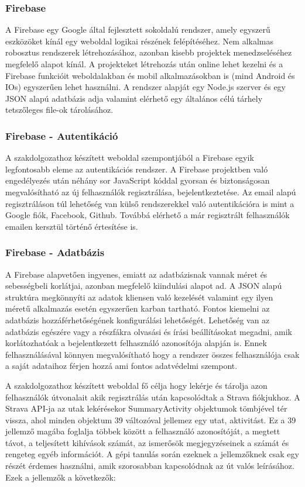 \subsubsection{Firebase}
A Firebase egy Google által fejlesztett sokoldalú rendszer, amely egyszerű eszközöket kínál egy weboldal logikai részének felépítéséhez. Nem alkalmas robosztus rendszerek létrehozásához, azonban kisebb projektek menedzseléséhez megfelelő alapot kínál. A projekteket létrehozás után online lehet kezelni és a Firebase funkcióit weboldalakban és mobil alkalmazásokban is (mind Android és IOs) egyszerűen lehet használni. A rendszer alapját egy Node.js szerver és egy JSON alapú adatbázis adja valamint elérhető egy általános célú tárhely tetszőleges file-ok tárolásához. 

\subsubsection{Firebase - Autentikáció}
A szakdolgozathoz készített weboldal szempontjából a Firebase egyik legfontosabb eleme az autentikációs rendszer. A Firebase projektben való engedélyezés után néhány sor JavaScript kóddal gyorsan és biztonságosan megvalósítható az új felhasználók regisztrálása, bejelentkeztetése. Az email alapú regisztráláson túl lehetőség van külső rendszerekkel való autentikációra is mint a Google fiók, Facebook, Github. Továbbá elérhető a már regisztrált felhasználók emailen kersztül történő értesítése is.

\subsubsection{Firebase - Adatbázis}
A Firebase alapvetően ingyenes, emiatt az adatbázisnak vannak méret és sebességbeli korlátjai, azonban megfelelő kiindulási alapot ad. A JSON alapú struktúra megkönnyíti az adatok kliensen való kezelését valamint egy ilyen méretű alkalmazás esetén egyszerűen karban tartható. Fontos kiemelni az adatbázis hozzáférhetőségének konfigurálási lehetőségét. Lehetőség van az adatbázis egészére vagy a részfákra olvasási és írási beállításokat megadni, amik korlátozhatóak a bejelentkezett felhasználó azonosítója alapján is. Ennek felhasználásával könnyen megvalósítható hogy a rendszer összes felhasználója csak a saját adataihoz férjen hozzá ami fontos adatvédelmi szempont.

 \label{ssec:adatstruktura}
A szakdolgozathoz készített weboldal fő célja hogy lekérje és tárolja azon felhasználók útvonalait akik regisztrálás után kapcsolódtak a Strava fiókjukhoz. A Strava API-ja az utak lekérésekor SummaryActivity objektumok tömbjével tér vissza, ahol minden objektum 39 változóval jellemez egy utat, aktivitást. Ez a 39 jellemző magába foglalja többek között a felhasználó azonosítóját, a megtett távot, a teljesített kihívások számát, az ismerősök megjegyzéseinek a számát és rengeteg egyéb információt. A gépi tanulás során ezeknek a jellemzőknek csak egy részét érdemes használni, amik szorosabban kapcsolódnak az út valós leírásához. Ezek a jellemzők a következők: 

